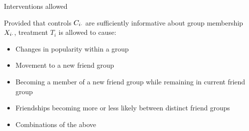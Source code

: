 \documentclass{beamer}
\theoremstyle{remark}
\begin{document}
\begin{frame}{Interventions allowed}

    Provided that controls $C_{i \cdot}$ are sufficiently informative about group membership $X_{i \cdot}$, treatment $T_i$ is allowed to cause:

    \begin{itemize}
        \item Changes in popularity within a group
        \item Movement to a new friend group
        \item Becoming a member of a new friend group while remaining in current friend group
        \item Friendships becoming more or less likely between distinct friend groups
        \item Combinations of the above
    \end{itemize}

\end{frame}



\end{document}
